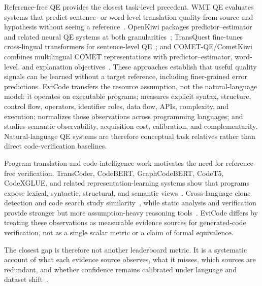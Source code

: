 ﻿\documentclass[conference]{IEEEtran}
\begin{document}
Reference-free QE provides the closest task-level precedent. WMT QE evaluates systems that predict sentence- or word-level translation quality from source and hypothesis without seeing a reference~\cite{fonseca2019wmtqe,blain2023wmtqe}. OpenKiwi packages predictor--estimator and related neural QE systems at both granularities~\cite{kepler2019openkiwi}; TransQuest fine-tunes cross-lingual transformers for sentence-level QE~\cite{ranasinghe2020transquest}; and COMET-QE/CometKiwi combines multilingual COMET representations with predictor--estimator, word-level, and explanation objectives~\cite{rei2022cometkiwi,rei2023scalingcometkiwi}. These approaches establish that useful quality signals can be learned without a target reference, including finer-grained error predictions. EviCode transfers the resource assumption, not the natural-language model: it operates on executable programs; measures explicit syntax, structure, control flow, operators, identifier roles, data flow, APIs, complexity, and execution; normalizes those observations across programming languages; and studies semantic observability, acquisition cost, calibration, and complementarity. Natural-language QE systems are therefore conceptual task relatives rather than direct code-verification baselines.

Program translation and code-intelligence work motivates the need for reference-free verification. TransCoder, CodeBERT, GraphCodeBERT, CodeT5, CodeXGLUE, and related representation-learning systems show that programs expose lexical, syntactic, structural, and semantic views~\cite{roziere2020transcoder,feng2020codebert,guo2021graphcodebert,wang2021codet5,lu2021codexglue,alon2019code2vec,mou2016tbcnn,allamanis2018survey}. Cross-language clone detection and code search study similarity~\cite{sajnani2016sourcerercc,jiang2007deckard,roy2009comparison}, while static analysis and verification provide stronger but more assumption-heavy reasoning tools~\cite{cousot1977abstract,hind2001pointer,tip1995slicing,necula1997proof,leino2010dafny}. EviCode differs by treating these observations as measurable evidence sources for generated-code verification, not as a single scalar metric or a claim of formal equivalence.

The closest gap is therefore not another leaderboard metric. It is a systematic account of what each evidence source observes, what it misses, which sources are redundant, and whether confidence remains calibrated under language and dataset shift~\cite{guo2017calibration}.
\end{document}
